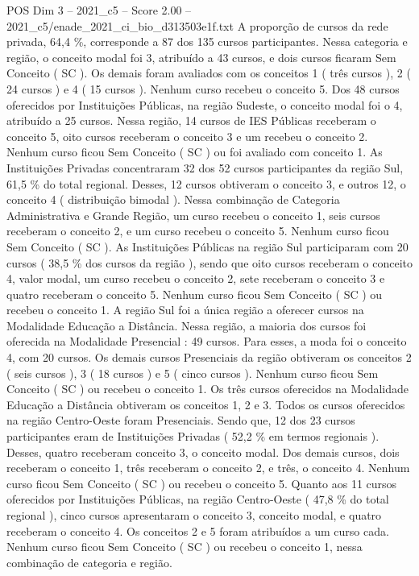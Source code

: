 \begin{textsample}{POS Dim 3 – 2021\_c5 – Score 2.00 – 2021\_c5/enade\_2021\_ci\_bio\_d313503e1f.txt}
A proporção de cursos da rede privada, 64,4 \%, corresponde a 87 dos 135 cursos participantes.
Nessa categoria e região, o conceito modal foi 3, atribuído a 43 cursos, e dois cursos ficaram Sem Conceito ( SC ).
Os demais foram avaliados com os conceitos 1 ( três cursos ), 2 ( 24 cursos ) e 4 ( 15 cursos ).
Nenhum curso recebeu o conceito 5.
Dos 48 cursos oferecidos por Instituições Públicas, na região Sudeste, o conceito modal foi o 4, atribuído a 25 cursos.
Nessa região, 14 cursos de IES Públicas receberam o conceito 5, oito cursos receberam o conceito 3 e um recebeu o conceito 2.
Nenhum curso ficou Sem Conceito ( SC ) ou foi avaliado com conceito 1.
As Instituições Privadas concentraram 32 dos 52 cursos participantes da região Sul, 61,5 \% do total regional.
Desses, 12 cursos obtiveram o conceito 3, e outros 12, o conceito 4 ( distribuição bimodal ).
Nessa combinação de Categoria Administrativa e Grande Região, um curso recebeu o conceito 1, seis cursos receberam o conceito 2, e um curso recebeu o conceito 5.
Nenhum curso ficou Sem Conceito ( SC ).
As Instituições Públicas na região Sul participaram com 20 cursos ( 38,5 \% dos cursos da região ), sendo que oito cursos receberam o conceito 4, valor modal, um curso recebeu o conceito 2, sete receberam o conceito 3 e quatro receberam o conceito 5.
Nenhum curso ficou Sem Conceito ( SC ) ou recebeu o conceito 1.
A região Sul foi a única região a oferecer cursos na Modalidade Educação a Distância.
Nessa região, a maioria dos cursos foi oferecida na Modalidade Presencial : 49 cursos.
Para esses, a moda foi o conceito 4, com 20 cursos.
Os demais cursos Presenciais da região obtiveram os conceitos 2 ( seis cursos ), 3 ( 18 cursos ) e 5 ( cinco cursos ).
Nenhum curso ficou Sem Conceito ( SC ) ou recebeu o conceito 1.
Os três cursos oferecidos na Modalidade Educação a Distância obtiveram os conceitos 1, 2 e 3.
Todos os cursos oferecidos na região Centro-Oeste foram Presenciais.
Sendo que, 12 dos 23 cursos participantes eram de Instituições Privadas ( 52,2 \% em termos regionais ).
Desses, quatro receberam conceito 3, o conceito modal.
Dos demais cursos, dois receberam o conceito 1, três receberam o conceito 2, e três, o conceito 4.
Nenhum curso ficou Sem Conceito ( SC ) ou recebeu o conceito 5.
Quanto aos 11 cursos oferecidos por Instituições Públicas, na região Centro-Oeste ( 47,8 \% do total regional ), cinco cursos apresentaram o conceito 3, conceito modal, e quatro receberam o conceito 4.
Os conceitos 2 e 5 foram atribuídos a um curso cada.
Nenhum curso ficou Sem Conceito ( SC ) ou recebeu o conceito 1, nessa combinação de categoria e região.

\end{textsample}
